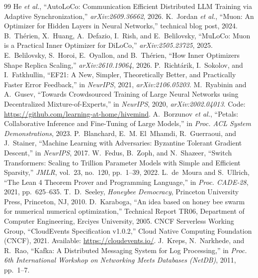 \documentclass[11pt,a4paper]{article}
\begin{document}
\begin{thebibliography}{99}
 He \textit{et al.}, ``AutoLoCo: Communication Efficient Distributed LLM Training via Adaptive Synchronization,'' \textit{arXiv:2609.36662}, 2026.
 K.~Jordan \textit{et al.}, ``Muon: An Optimizer for Hidden Layers in Neural Networks,'' technical blog post, 2024.
 B.~Th\'erien, X.~Huang, A.~Defazio, I.~Rish, and E.~Belilovsky, ``MuLoCo: Muon is a Practical Inner Optimizer for DiLoCo,'' \textit{arXiv:2505.23725}, 2025.
 E.~Belilovsky, S.~Horoi, E.~Oyallon, and B.~Th\'erien, ``How Inner Optimizers Shape Replica Scaling,'' \textit{arXiv:2610.19064}, 2026.
 P.~Richt\'arik, I.~Sokolov, and I.~Fatkhullin, ``EF21: A New, Simpler, Theoretically Better, and Practically Faster Error Feedback,'' in \textit{NeurIPS}, 2021, \textit{arXiv:2106.05203}.
 M.~Ryabinin and A.~Gusev, ``Towards Crowdsourced Training of Large Neural Networks using Decentralized Mixture-of-Experts,'' in \textit{NeurIPS}, 2020, \textit{arXiv:2002.04013}. Code: \url{https://github.com/learning-at-home/hivemind}.
 A.~Borzunov \textit{et al.}, ``Petals: Collaborative Inference and Fine-Tuning of Large Models,'' in \textit{Proc. ACL System Demonstrations}, 2023.
 P.~Blanchard, E.~M. El~Mhamdi, R.~Guerraoui, and J.~Stainer, ``Machine Learning with Adversaries: Byzantine Tolerant Gradient Descent,'' in \textit{NeurIPS}, 2017.
 W.~Fedus, B.~Zoph, and N.~Shazeer, ``Switch Transformers: Scaling to Trillion Parameter Models with Simple and Efficient Sparsity,'' \textit{JMLR}, vol.~23, no.~120, pp.~1--39, 2022.
 L.~de~Moura and S.~Ullrich, ``The Lean 4 Theorem Prover and Programming Language,'' in \textit{Proc. CADE-28}, 2021, pp.~625--635.
 T.~D.~Seeley, \textit{Honeybee Democracy}, Princeton University Press, Princeton, NJ, 2010.
 D.~Karaboga, ``An idea based on honey bee swarm for numerical numerical optimization,'' Technical Report TR06, Department of Computer Engineering, Erciyes University, 2005.
 CNCF Serverless Working Group, ``CloudEvents Specification v1.0.2,'' Cloud Native Computing Foundation (CNCF), 2021. Available: \url{https://cloudevents.io/}.
 J.~Kreps, N.~Narkhede, and R.~Rao, ``Kafka: A Distributed Messaging System for Log Processing,'' in \textit{Proc. 6th International Workshop on Networking Meets Databases (NetDB)}, 2011, pp.~1--7.

\end{thebibliography}
\end{document}
